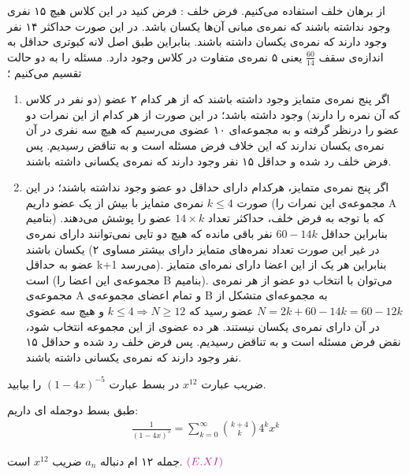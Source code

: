 \documentclass[11pt,largemargins]{h2wp}
\begin{document}

از برهان خلف استفاده می‌کنیم. فرض خلف : فرض کنید در این کلاس هیچ ۱۵ نفری وجود نداشته باشند که نمره‌ی مبانی آن‌ها یکسان باشد.
در این صورت حداکثر ۱۴ نفر وجود دارند که نمره‌ی یکسان داشته باشند. بنابراین  طبق اصل لانه کبوتری حداقل به اندازه‌ی سقف
$\frac{60}{14}$
یعنی ۵ نمره‌ی متفاوت در کلاس وجود دارد. مسئله را به دو حالت تقسیم می‌کنیم ؛
\begin{enumerate}
    \item 
    اگر پنج نمره‌ی متمایز وجود داشته باشند که از هر کدام ۲ عضو
    (دو نفر در کلاس که آن نمره را دارند)
    وجود داشته باشد؛ در این صورت از هر کدام از این نمرات دو عضو را درنظر گرفته و به مجموعه‌ای ۱۰ عضوی
    می‌رسیم که هیچ سه نفری در آن نمره‌ی یکسان ندارند که این خلاف فرض مسئله است و به تناقض رسیدیم.
    پس فرض خلف رد شده و حداقل ۱۵ نفر وجود دارند که نمره‌ی یکسانی داشته باشند.
    
    \item 
    اگر پنج نمره‌ی متمایز، هرکدام دارای حداقل دو عضو وجود نداشته باشند؛
    در این صورت 
    $k \le 4$
    نمره‌ی متمایز با بیش از یک عضو داریم
    (مجموعه‌ی این نمرات را A بنامیم)
    که با توجه به فرض خلف، حداکثر تعداد
    $14 \times k$
    عضو را پوشش می‌دهند. بنابراین حداقل 
    $60 - 14k$
    نفر باقی مانده که هیچ دو تایی نمی‌توانند دارای نمره‌ی یکسان باشند
    (در غیر این صورت تعداد نمره‌های متمایز دارای بیشتر مساوی ۲ عضو به حداقل k+1 می‌رسد).
    بنابراین هر یک از این اعضا دارای نمره‌ای متمایز است
    (مجموعه‌ی این اعضا را B بنامیم).
    می‌توان با انتخاب دو عضو از هر نمره‌ی مجموعه‌ی
    A
    و تمام اعضای مجموعه‌‌ی
    B
    به مجموعه‌ای متشکل از
    $N = 2k + 60 - 14k = 60 - 12k$
    عضو رسید که
    $k \le 4 \Rightarrow N \ge 12$
    و هیچ سه عضوی در آن دارای نمره‌ی یکسان نیستند.
    هر ده عضوی از این مجموعه انتخاب شود، نقض فرض مسئله است و به تناقض رسیدیم.
    پس فرض خلف رد شده و حداقل ۱۵ نفر وجود دارند که نمره‌ی یکسانی داشته باشند.
\end{enumerate}



\question
ضریب عبارت $ x ^ {12}$
در بسط عبارت
$(1-4x)^{-5}$
را بیابید.

\solution
طبق بسط دوجمله ای داریم:    
    \begin{align*}
    \frac{1}{(1-4x)^5}=\sum\limits_{k=0}^{\infty} \binom{k+4}{k}  4 ^ k  x^ k              
    \end{align*}
    
    جمله ۱۲ ام دنباله 
    $ a_n$
  ضریب 
  $ x ^ {12} $
  است.
$ {\textcolor{byzantine}{(E.XI)}}  $
\end{document}

